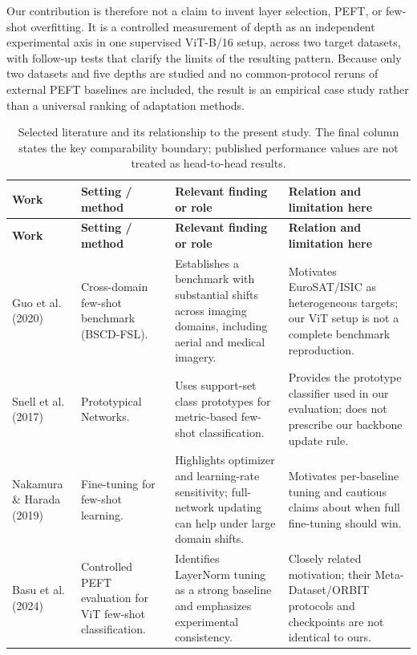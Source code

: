 \documentclass[11pt]{article}
\begin{document}
Our contribution is therefore not a claim to invent layer selection, PEFT, or few-shot overfitting. It is a controlled measurement of depth as an independent experimental axis in one supervised ViT-B/16 setup, across two target datasets, with follow-up tests that clarify the limits of the resulting pattern. Because only two datasets and five depths are studied and no common-protocol reruns of external PEFT baselines are included, the result is an empirical case study rather than a universal ranking of adaptation methods.

\begin{longtable}{P{0.13\textwidth}P{0.21\textwidth}P{0.28\textwidth}P{0.24\textwidth}}
\caption{Selected literature and its relationship to the present study. The final column states the key comparability boundary; published performance values are not treated as head-to-head results.}\label{tab:litreview}\\
\toprule
\textbf{Work} & \textbf{Setting / method} & \textbf{Relevant finding or role} & \textbf{Relation and limitation here}\\
\midrule
\endfirsthead
\toprule
\textbf{Work} & \textbf{Setting / method} & \textbf{Relevant finding or role} & \textbf{Relation and limitation here}\\
\midrule
\endhead
Guo et al. (2020) \cite{guo2020} & Cross-domain few-shot benchmark (BSCD-FSL). & Establishes a benchmark with substantial shifts across imaging domains, including aerial and medical imagery. & Motivates EuroSAT/ISIC as heterogeneous targets; our ViT setup is not a complete benchmark reproduction.\\
Snell et al. (2017) \cite{snell2017} & Prototypical Networks. & Uses support-set class prototypes for metric-based few-shot classification. & Provides the prototype classifier used in our evaluation; does not prescribe our backbone update rule.\\
Nakamura \& Harada (2019) \cite{nakamura2019} & Fine-tuning for few-shot learning. & Highlights optimizer and learning-rate sensitivity; full-network updating can help under large domain shifts. & Motivates per-baseline tuning and cautious claims about when full fine-tuning should win.\\
Basu et al. (2024) \cite{basu2024} & Controlled PEFT evaluation for ViT few-shot classification. & Identifies LayerNorm tuning as a strong baseline and emphasizes experimental consistency. & Closely related motivation; their Meta-Dataset/ORBIT protocols and checkpoints are not identical to ours.\\

\end{longtable}
\end{document}
